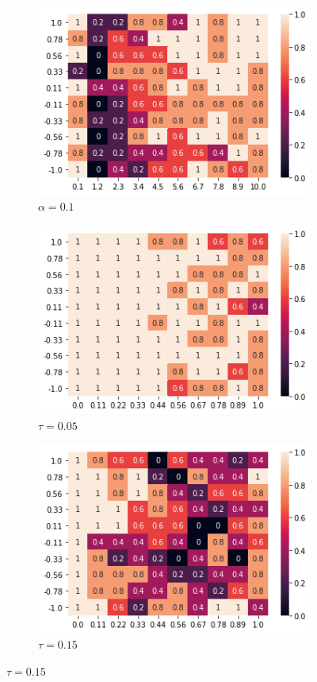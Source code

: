 \documentclass[.../main.tex]{subfiles}
\begin{document}
\begin{figure}[h]
\begin{subfigure}[b]{0.45 \textwidth}
	\end{subfigure}
	\begin{subfigure}[b]{0.45 \textwidth}
	\centering
	\includegraphics[width = 0.7 \textwidth]{Figures/Alpha_2_Run_2.png}
	\caption{$\alpha = 0.1$}
	\end{subfigure}
	\begin{subfigure}[b]{0.45 \textwidth}
	\centering
	\includegraphics[width = 0.7 \textwidth]{Figures/AlphaRun_tau_005.png}
	\caption{$\tau = 0.05$}
	\end{subfigure}
	\begin{subfigure}[b]{0.45 \textwidth}
	\centering
	\includegraphics[width = 0.7 \textwidth]{Figures/tau_015.png}
	\caption{$\tau = 0.15$}
	\end{subfigure}


\end{figure}
\end{document}
